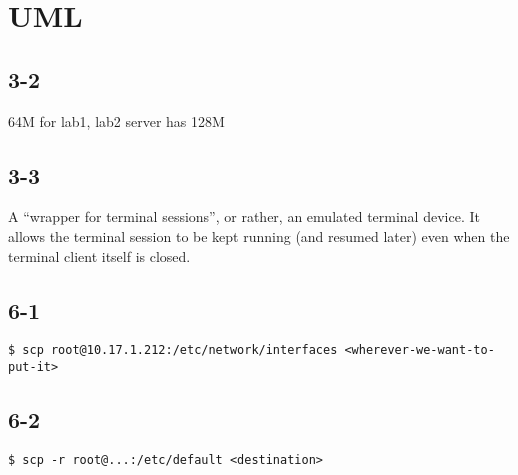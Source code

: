 \section{UML}
\subsection{3-2}
64M for lab1, lab2 server has 128M

\subsection{3-3}
A ``wrapper for terminal sessions'', or rather, an emulated terminal device. It allows the terminal session to be kept running (and resumed later) even when the terminal client itself is closed.

\subsection{6-1}
\verb=$ scp root@10.17.1.212:/etc/network/interfaces <wherever-we-want-to-put-it>=

\subsection{6-2}
\verb=$ scp -r root@...:/etc/default <destination>=
